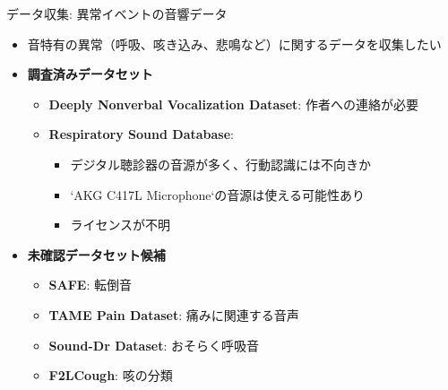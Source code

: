 \documentclass[unicode,12pt,aspectratio=169,dvipdfmx]{beamer}
\begin{document}
\begin{frame}{データ収集: 異常イベントの音響データ}
  \begin{itemize}
    \item 音特有の異常（呼吸、咳き込み、悲鳴など）に関するデータを収集したい
    \item \textbf{調査済みデータセット}
    \begin{itemize}
        \item \textbf{Deeply Nonverbal Vocalization Dataset}: 作者への連絡が必要
        \item \textbf{Respiratory Sound Database}:
        \begin{itemize}
            \item デジタル聴診器の音源が多く、行動認識には不向きか
            \item `AKG C417L Microphone`の音源は使える可能性あり
            \item ライセンスが不明
        \end{itemize}
    \end{itemize}
    \item \textbf{未確認データセット候補}
    \begin{itemize}
        \item \textbf{SAFE}: 転倒音
        \item \textbf{TAME Pain Dataset}: 痛みに関連する音声
        \item \textbf{Sound-Dr Dataset}: おそらく呼吸音
        \item \textbf{F2LCough}: 咳の分類
    \end{itemize}
  \end{itemize}
\end{frame}

\end{document}
